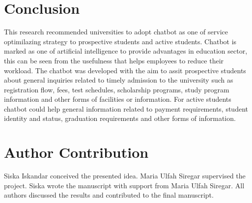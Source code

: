 \documentclass[conference]{IEEEtran}
\begin{document}
\section{Conclusion}
This research recommended universities to adopt chatbot as one of service optimilazing strategy to prospective students and active students. Chatbot is marked as one of artificial intelligence to provide advantages in education sector, this can be seen from the usefulness that helps employees to reduce their workload. The chatbot was developed with the aim to assit prospective students about general inquiries related to timely admission to the university such as registration flow, fees, test schedules, scholarship programs, study program information and other forms of facilities or information. For active students chatbot could help general information related to payment requirements, student identity and status, graduation requirements and other forms of information.

\section*{Author Contribution}
Siska Iskandar conceived the presented idea. Maria Ulfah Siregar supervised the project. Siska wrote the manuscript with support from Maria Ulfah Siregar. All authors discussed the results and contributed to the final manuscript.
\end{document}
